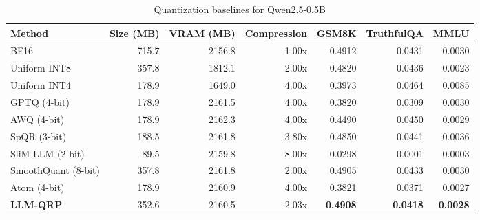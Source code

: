 \begin{table}[htbp]
  \centering
  \small
  \caption{Quantization baselines for Qwen2.5-0.5B}
  \label{tab:bench_Qwen2.5_0.5B}
  \begin{tabular}{lrrrrrr}
    \toprule
    \textbf{Method} & \textbf{Size (MB)} & \textbf{VRAM (MB)} & \textbf{Compression} & \textbf{GSM8K} & \textbf{TruthfulQA} & \textbf{MMLU} \\
    \midrule
    BF16 & 715.7 & 2156.8 & 1.00x & 0.4912 & 0.0431 & 0.0030 \\
    Uniform INT8 & 357.8 & 1812.1 & 2.00x & 0.4820 & 0.0436 & 0.0023 \\
    Uniform INT4 & 178.9 & 1649.0 & 4.00x & 0.3973 & 0.0464 & 0.0085 \\
    GPTQ (4-bit) & 178.9 & 2161.5 & 4.00x & 0.3820 & 0.0309 & 0.0030 \\
    AWQ (4-bit) & 178.9 & 2162.3 & 4.00x & 0.4490 & 0.0450 & 0.0029 \\
    SpQR (3-bit) & 188.5 & 2161.8 & 3.80x & 0.4850 & 0.0441 & 0.0036 \\
    SliM-LLM (2-bit) & 89.5 & 2159.8 & 8.00x & 0.0298 & 0.0001 & 0.0003 \\
    SmoothQuant (8-bit) & 357.8 & 2161.8 & 2.00x & 0.4905 & 0.0433 & 0.0030 \\
    Atom (4-bit) & 178.9 & 2160.9 & 4.00x & 0.3821 & 0.0371 & 0.0027 \\
    \midrule
    \textbf{LLM-QRP} & 352.6 & 2160.5 & 2.03x & \textbf{0.4908} & \textbf{0.0418} & \textbf{0.0028} \\
    \bottomrule
  \end{tabular}
\end{table}
